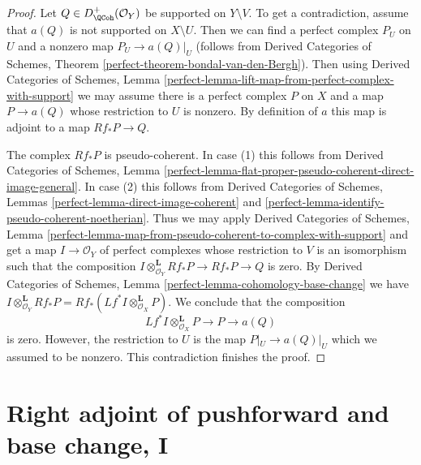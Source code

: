\begin{proof}
Let $Q \in D^+_\QCoh(\mathcal{O}_Y)$ be supported on $Y \setminus V$.
To get a contradiction, assume that $a(Q)$ is not supported on
$X \setminus U$. Then we can find a perfect complex $P_U$ on $U$
and a nonzero map $P_U \to a(Q)|_U$ (follows from
Derived Categories of Schemes, Theorem
\ref{perfect-theorem-bondal-van-den-Bergh}). Then using
Derived Categories of Schemes, Lemma
\ref{perfect-lemma-lift-map-from-perfect-complex-with-support}
we may assume there is a perfect complex $P$ on $X$ and a map
$P \to a(Q)$ whose restriction to $U$ is nonzero.
By definition of $a$ this map
is adjoint to a map $Rf_*P \to Q$.

\medskip\noindent
The complex $Rf_*P$ is pseudo-coherent. In case (1) this follows
from Derived Categories of Schemes, Lemma
\ref{perfect-lemma-flat-proper-pseudo-coherent-direct-image-general}.
In case (2) this follows from
Derived Categories of Schemes, Lemmas
\ref{perfect-lemma-direct-image-coherent} and
\ref{perfect-lemma-identify-pseudo-coherent-noetherian}.
Thus we may apply
Derived Categories of Schemes, Lemma
\ref{perfect-lemma-map-from-pseudo-coherent-to-complex-with-support}
and get a map $I \to \mathcal{O}_Y$ of perfect complexes
whose restriction to $V$ is an isomorphism such that the composition
$I \otimes^\mathbf{L}_{\mathcal{O}_Y} Rf_*P \to Rf_*P \to Q$ is zero.
By Derived Categories of Schemes, Lemma
\ref{perfect-lemma-cohomology-base-change}
we have $I \otimes^\mathbf{L}_{\mathcal{O}_Y} Rf_*P =
Rf_*(Lf^*I \otimes^\mathbf{L}_{\mathcal{O}_X} P)$.
We conclude that the composition
$$
Lf^*I \otimes^\mathbf{L}_{\mathcal{O}_X} P \to P \to a(Q)
$$
is zero. However, the restriction to $U$ is the map
$P|_U \to a(Q)|_U$ which we assumed to be nonzero.
This contradiction finishes the proof.
\end{proof}












\section{Right adjoint of pushforward and base change, I}
\label{section-base-change-map}

